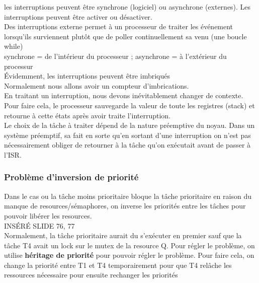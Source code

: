 \documentclass[oneside]{book}
\begin{document}
    les interruptions peuvent être synchrone (logiciel) ou asynchrone (externes). Les interruptions peuvent être activer ou désactiver.\\
    
    Des interruptions externe permet à un processeur de traiter les événement lorsqu'ils surviennent plutôt que de poller continuellement sa venu (une boucle while)\\
    
    synchrone = de l'intérieur du processeur ; asynchrone = à l'extérieur du processur\\
    
    Évidemment, les interruptions peuvent être imbriqués\\
    
    Normalement nous allons avoir un compteur d'imbrications.\\
    
    En traitant un interruption, nous devons inévitablement changer de contexte. Pour faire cela, le processeur sauvegarde la valeur de toute les registres (stack) et retourne à cette états après avoir traite l'interruption.\\
    
    Le choix de la tâche à traiter dépend de la nature préemptive du noyau. Dans un système préemptif, sa fait en sorte qu'en sortant d'une interruption on n'est pas nécessairement obliger de retourner à la tâche qu'on exécutait avant de passer à l'ISR.\\
    
    \subsubsection{Problème d'inversion de priorité}
    Dans le cas ou la tâche moins prioritaire bloque la tâche prioritaire en raison du manque de resources/sémaphores, on inverse les priorités entre les tâches pour pouvoir libérer les resources.\\
    
    INSÉRÉ SLIDE 76, 77\\
    
    Normalement, la tâche prioritaire aurait du s'exécuter en premier sauf que la tâche T4 avait un lock sur le mutex de la resource Q. Pour régler le problème, on utilise \textbf{héritage de priorité} pour pouvoir régler le problème. Pour faire cela, on change la priorité entre T1 et T4 temporairement pour que T4 relâche les ressources nécessaire pour ensuite rechanger les priorités\\
    
\end{document}

